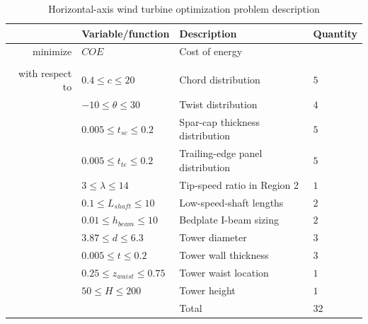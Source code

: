 \documentclass[]{aiaa-tc} %
\begin{document}
    \begin{table}[!htb]
        \centering
        \caption{Horizontal-axis wind turbine optimization problem description}
        \begin{tabular}{r l l l}
            \toprule
            & Variable/function & Description & Quantity \\
            \midrule
            minimize            & $COE$ & Cost of energy \\
            \\
            with respect to & $0.4 \le c \le 20$ & Chord distribution & $5$ \\
                                    & $-10 \le \theta \le 30$ & Twist distribution & $4$ \\
                                    & $0.005 \le t_{sc} \le 0.2$ & Spar-cap thickness distribution & $5$ \\
                                    & $0.005 \le t_{te} \le 0.2$ & Trailing-edge panel distribution & $5$ \\
                                    & $3 \le \lambda \le 14$ & Tip-speed ratio in Region 2 & $1$ \\
                                    & $0.1 \le L_{shaft} \le 10$ & Low-speed-shaft lengths & $2$ \\
                                    & $0.01 \le h_{beam} \le 10$ & Bedplate I-beam sizing & $2$ \\
                                    & $3.87 \le d \le 6.3$ & Tower diameter & $3$ \\
                                    & $0.005 \le t \le 0.2$ & Tower wall thickness & $3$ \\
                                    & $0.25 \le z_{waist} \le 0.75$ & Tower waist location & $1$ \\
                                    & $50 \le H \le 200$ & Tower height & $1$ \\
                                    & & Total & $32$ \\


\end{tabular}
\end{table}
\end{document}
